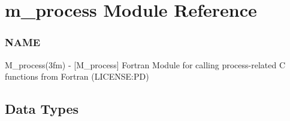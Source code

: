 \hypertarget{namespacem__process}{}\section{m\+\_\+process Module Reference}
\label{namespacem__process}


\subsubsection*{N\+A\+ME}

M\+\_\+process(3fm) -\/ \mbox{[}M\+\_\+process\mbox{]} Fortran Module for calling process-\/related C functions from Fortran (L\+I\+C\+E\+N\+SE\+:PD)  


\subsection*{Data Types}
